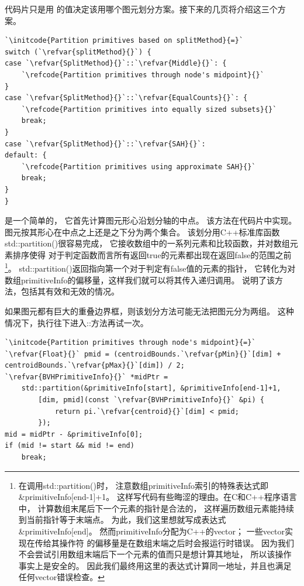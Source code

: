 代码片只是用
的值决定该用哪个图元划分方案。接下来的几页将介绍这三个方案。
\begin{lstlisting}
`\initcode{Partition primitives based on splitMethod}{=}`
switch (`\refvar{splitMethod}{}`) {
case `\refvar{SplitMethod}{}`::`\refvar{Middle}{}`: {
    `\refcode{Partition primitives through node's midpoint}{}`
}
case `\refvar{SplitMethod}{}`::`\refvar{EqualCounts}{}`: {
    `\refcode{Partition primitives into equally sized subsets}{}`
    break;
}
case `\refvar{SplitMethod}{}`::`\refvar{SAH}{}`:
default: {
    `\refcode{Partition primitives using approximate SAH}{}`
    break;
}
}
\end{lstlisting}

是一个简单的，
它首先计算图元形心沿划分轴的中点。
该方法在代码片中实现。
图元按其形心在中点之上还是之下分为两个集合。
该划分用C++标准库函数{\ttfamily std::partition()}很容易完成，
它接收数组中的一系列元素和比较函数，并对数组元素排序使得
对于判定函数而言所有返回{\ttfamily true}的元素都出现在返回{\ttfamily false}的范围之前
\footnote{在调用{\ttfamily std::partition()}时，
注意数组{\ttfamily primitiveInfo}索引的特殊表达式即{\ttfamily \&primitiveInfo[end-1]+1}。
这样写代码有些晦涩的理由。在C和C++程序语言中，
计算数组末尾后下一个元素的指针是合法的，
这样遍历数组元素能持续到当前指针等于末端点。
为此，我们这里想就写成表达式{\ttfamily \&primitiveInfo[end]}。
然而{\ttfamily primitiveInfo}分配为C++的{\ttfamily vector}；
一些{\ttfamily vector}实现在传给其{\ttfamily []}操作符
的偏移量是在数组末端之后时会报运行时错误。
因为我们不会尝试引用数组末端后下一个元素的值而只是想计算其地址，
所以该操作事实上是安全的。
因此我们最终用这里的表达式计算同一地址，并且也满足任何{\ttfamily vector}错误检查。}。
{\ttfamily std::partition()}返回指向第一个对于判定有{\ttfamily false}值的元素的指针，
它转化为对数组{\ttfamily primitiveInfo}的偏移量，这样我们就可以将其传入递归调用。
说明了该方法，包括其有效和无效的情况。

如果图元都有巨大的重叠边界框，则该划分方法可能无法把图元分为两组。
这种情况下，执行往下进入{\ttfamily {}::}方法再试一次。
\begin{lstlisting}
`\initcode{Partition primitives through node's midpoint}{=}`
`\refvar{Float}{}` pmid = (centroidBounds.`\refvar{pMin}{}`[dim] + centroidBounds.`\refvar{pMax}{}`[dim]) / 2;
`\refvar{BVHPrimitiveInfo}{}` *midPtr =
    std::partition(&primitiveInfo[start], &primitiveInfo[end-1]+1,
        [dim, pmid](const `\refvar{BVHPrimitiveInfo}{}` &pi) {
            return pi.`\refvar{centroid}{}`[dim] < pmid;
        });
mid = midPtr - &primitiveInfo[0];
if (mid != start && mid != end)
    break;
\end{lstlisting}

